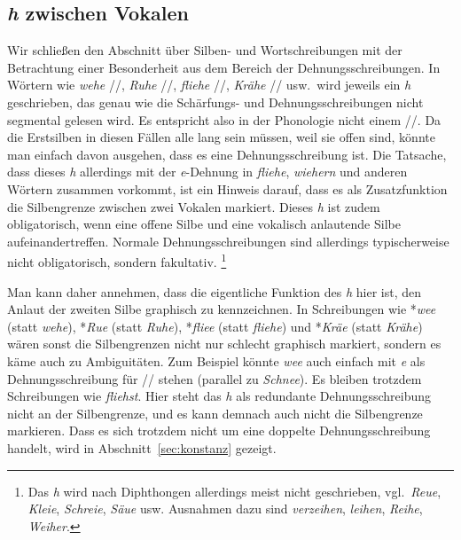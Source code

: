 \subsection{\textit{h} zwischen Vokalen}

\label{sec:intervokh}

Wir schließen den Abschnitt über Silben- und Wortschreibungen mit der Betrachtung einer Besonderheit aus dem Bereich der Dehnungsschreibungen.
In Wörtern wie \textit{wehe} //, \textit{Ruhe} //, \textit{fliehe} //, \textit{Krähe} // usw.\ wird jeweils ein \textit{h} geschrieben, das genau wie die Schärfungs- und Dehnungsschreibungen nicht segmental gelesen wird.
Es entspricht also in der Phonologie nicht einem //.
Da die Erstsilben in diesen Fällen alle lang sein müssen, weil sie offen sind, könnte man einfach davon ausgehen, dass es eine Dehnungsschreibung ist.
Die Tatsache, dass dieses \textit{h} allerdings mit der \textit{e}-Dehnung in \textit{fliehe}, \textit{wiehern} und anderen Wörtern zusammen vorkommt, ist ein Hinweis darauf, dass es als Zusatzfunktion die Silbengrenze zwischen zwei Vokalen markiert.
Dieses \textit{h} ist zudem obligatorisch, wenn eine offene Silbe und eine vokalisch anlautende Silbe aufeinandertreffen.
Normale Dehnungsschreibungen sind allerdings typischerweise nicht obligatorisch, sondern fakultativ.%
\footnote{Das \textit{h} wird nach Diphthongen allerdings meist nicht geschrieben, vgl.\ \textit{Reue}, \textit{Kleie}, \textit{Schreie}, \textit{Säue} usw.
Ausnahmen dazu sind \zB \textit{verzeihen}, \textit{leihen}, \textit{Reihe}, \textit{Weiher}.}

Man kann daher annehmen, dass die eigentliche Funktion des \textit{h} hier ist, den Anlaut der zweiten Silbe graphisch zu kennzeichnen.
In Schreibungen wie *\textit{wee} (statt \textit{wehe}), *\textit{Rue} (statt \textit{Ruhe}), *\textit{fliee} (statt \textit{fliehe}) und *\textit{Kräe} (statt \textit{Krähe}) wären sonst die Silbengrenzen nicht nur schlecht graphisch markiert, sondern es käme auch zu Ambiguitäten.
Zum Beispiel könnte \textit{wee} auch einfach mit \textit{e} als Dehnungsschreibung für // stehen (parallel zu \textit{Schnee}).
Es bleiben trotzdem Schreibungen wie \textit{fliehst}.
Hier steht das \textit{h} als redundante Dehnungsschreibung nicht an der Silbengrenze, und es kann demnach auch nicht die Silbengrenze markieren.
Dass es sich trotzdem nicht um eine doppelte Dehnungsschreibung handelt, wird in Abschnitt~\ref{sec:konstanz} gezeigt.


